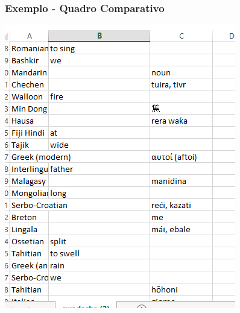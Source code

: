\documentclass{beamer}
\begin{document}
\begin{frame}
\frametitle{Exemplo - Quadro Comparativo}
\includegraphics[width=\textwidth, height=\textheight]{comparative6.png}
\end{frame}
\end{document}
